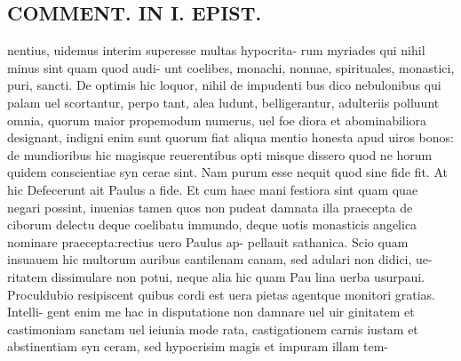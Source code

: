 \documentclass{article}
\begin{document}
\begin{pages}
\section*{COMMENT. IN I. EPIST. }\pstart nentius, uidemus interim superesse multas hypocrita- rum myriades qui nihil minus sint quam quod audi- unt coelibes, monachi, nonnae, spirituales, monastici, puri, sancti. De optimis hic loquor, nihil de impudenti bus dico nebulonibus qui palam uel scortantur, perpo tant, alea ludunt, belligerantur, adulteriis polluunt omnia, quorum maior propemodum numerus, uel foe diora et abominabiliora designant, indigni enim sunt quorum fiat aliqua mentio honesta apud uiros bonos: de mundioribus hic magisque reuerentibus opti misque dissero quod ne horum quidem conscientiae syn cerae sint. Nam purum esse nequit quod sine fide fit. At hic Defecerunt ait Paulus a fide. Et cum haec mani festiora sint quam quae negari possint, inuenias tamen quos non pudeat damnata illa praecepta de ciborum delectu deque coelibatu immundo, deque uotis monasticis angelica nominare praecepta:rectius uero Paulus ap- pellauit sathanica. Scio quam insuauem hic multorum auribus cantilenam canam, sed adulari non didici, ue- ritatem dissimulare non potui, neque alia hic quam Pau lina uerba usurpaui. Proculdubio resipiscent quibus cordi est uera pietas agentque monitori gratias. Intelli- gent enim me hac in disputatione non damnare uel uir ginitatem et castimoniam sanctam uel ieiunia mode rata, castigationem carnis iustam et abstinentiam syn ceram, sed hypocrisim magis et impuram illam tem-  \pend

\end{pages}
\end{document}
